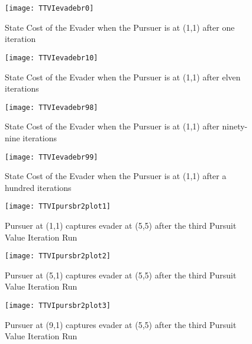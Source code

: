 \begin{figure}
\vspace{2.4in}
\centering
\texttt{[image: TTVIevadebr0]}
\caption{State Cost of the Evader when the Pursuer is at (1,1) after one iteration}
\label{TTVIevadebr0}
\end{figure}
\clearpage
\newpage

\begin{figure}
\vspace{2.4in}
\centering
\texttt{[image: TTVIevadebr10]}
\caption{State Cost of the Evader when the Pursuer is at (1,1) after elven iterations}
\label{TTVIevadebr10}
\end{figure}
\clearpage
\newpage

\begin{figure}
\vspace{2.4in}
\centering
\texttt{[image: TTVIevadebr98]}
\caption{State Cost of the Evader when the Pursuer is at (1,1) after ninety-nine iterations}
\label{TTVIevadebr98}
\end{figure}
\clearpage
\newpage

\begin{figure}
\vspace{2.4in}
\centering
\texttt{[image: TTVIevadebr99]}
\caption{State Cost of the Evader when the Pursuer is at (1,1) after a hundred iterations}
\label{TTVIevadebr99}
\end{figure}
\clearpage
\newpage

\begin{figure}
\vspace{2.4in}
\centering
\texttt{[image: TTVIpursbr2plot1]}
\caption{Pursuer at (1,1) captures evader at (5,5) after the third Pursuit Value Iteration Run}
\label{TTVIpursbr2plot1}
\end{figure}
\clearpage
\newpage

\begin{figure}
\vspace{2.4in}
\centering
\texttt{[image: TTVIpursbr2plot2]}
\caption{Pursuer at (5,1) captures evader at (5,5) after the third Pursuit Value Iteration Run}
\label{TTVIpursbr2plot2}
\end{figure}
\clearpage
\newpage

\begin{figure}
\vspace{2.4in}
\centering
\texttt{[image: TTVIpursbr2plot3]}
\caption{Pursuer at (9,1) captures evader at (5,5) after the third Pursuit Value Iteration Run}
\label{TTVIpursbr2plot3}
\end{figure}
\clearpage
\newpage

